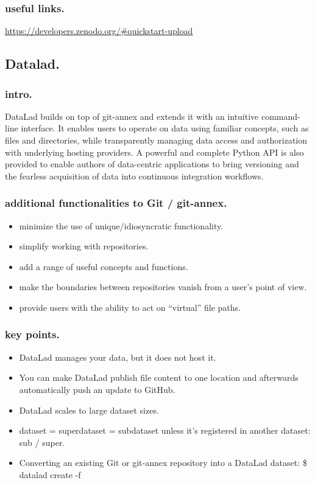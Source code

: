 \documentclass[11pt]{article}
\begin{document}
\subsubsection{useful links.}
\label{sec:org235ef0f}
\url{https://developers.zenodo.org/\#quickstart-upload}


\subsection{Datalad.}
\label{sec:org0e663e4}
\subsubsection{intro.}
\label{sec:org08b5349}
DataLad builds on top of git-annex and extends it with an
intuitive command-line interface. It enables users to operate
on data using familiar concepts, such as files and directories,
while transparently managing data access and authorization with
underlying hosting providers.
A powerful and complete Python API is also provided to enable
authors of data-centric applications to bring versioning and the
fearless acquisition of data into continuous integration workflows.

\subsubsection{additional functionalities to Git / git-annex.}
\label{sec:orgc1cbde1}
\begin{itemize}
\item minimize the use of unique/idiosyncratic functionality.
\item simplify working with repositories.
\item add a range of useful concepts and functions.
\item make the boundaries between repositories vanish from a user’s
point of view.
\item provide users with the ability to act on “virtual” file paths.
\end{itemize}

\subsubsection{key points.}
\label{sec:orge8be0c0}
\begin{itemize}
\item DataLad manages your data, but it does not host it.
\item You can make DataLad publish file content to one location
and afterwards automatically push an update to GitHub.
\item DataLad scales to large dataset sizes.
\item dataset = superdataset = subdataset unless it's registered
in another dataset: sub / super.
\item Converting an existing Git or git-annex repository into a
DataLad dataset: 	\$ datalad create -f
\end{itemize}
\end{document}
